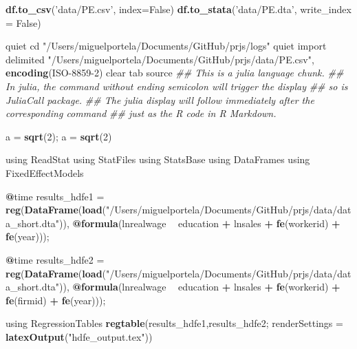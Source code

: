 \documentclass[
  12pt,
]{article}
\newenvironment{Shaded}{\begin{snugshade}}{\end{snugshade}}
\newcommand{\CommentTok}[1]{\textcolor[rgb]{0.56,0.35,0.01}{\textit{#1}}}
\newcommand{\DataTypeTok}[1]{\textcolor[rgb]{0.13,0.29,0.53}{#1}}
\newcommand{\DecValTok}[1]{\textcolor[rgb]{0.00,0.00,0.81}{#1}}
\newcommand{\KeywordTok}[1]{\textcolor[rgb]{0.13,0.29,0.53}{\textbf{#1}}}
\newcommand{\NormalTok}[1]{#1}
\newcommand{\OperatorTok}[1]{\textcolor[rgb]{0.81,0.36,0.00}{\textbf{#1}}}
\newcommand{\StringTok}[1]{\textcolor[rgb]{0.31,0.60,0.02}{#1}}
\begin{document}
\begin{Shaded}
\begin{Highlighting}[]
\KeywordTok{df.to_csv}\NormalTok{(}\StringTok{'data/PE.csv'}\NormalTok{, }\DataTypeTok{index=}\NormalTok{False)}
\KeywordTok{df.to_stata}\NormalTok{(}\StringTok{'data/PE.dta'}\NormalTok{, }\DataTypeTok{write_index =}\NormalTok{ False)}


\NormalTok{quiet cd }\StringTok{"/Users/miguelportela/Documents/GitHub/prjs/logs"}
\NormalTok{quiet import delimited }\StringTok{"/Users/miguelportela/Documents/GitHub/prjs/data/PE.csv"}\NormalTok{, }\KeywordTok{encoding}\NormalTok{(ISO}\DecValTok{-8859-2}\NormalTok{) clear }
\NormalTok{tab source}
\CommentTok{## This is a julia language chunk.}
\CommentTok{## In julia, the command without ending semicolon will trigger the display}
\CommentTok{## so is JuliaCall package.}
\CommentTok{## The julia display will follow immediately after the corresponding command}
\CommentTok{## just as the R code in R Markdown.}

\NormalTok{a =}\StringTok{ }\KeywordTok{sqrt}\NormalTok{(}\DecValTok{2}\NormalTok{);}
\NormalTok{a =}\StringTok{ }\KeywordTok{sqrt}\NormalTok{(}\DecValTok{2}\NormalTok{)}

\NormalTok{using ReadStat}
\NormalTok{using StatFiles}
\NormalTok{using StatsBase}
\NormalTok{using DataFrames}
\NormalTok{using FixedEffectModels}

\OperatorTok{@}\NormalTok{time results_hdfe1 =}\StringTok{ }\KeywordTok{reg}\NormalTok{(}\KeywordTok{DataFrame}\NormalTok{(}\KeywordTok{load}\NormalTok{(}\StringTok{"/Users/miguelportela/Documents/GitHub/prjs/data/data_short.dta"}\NormalTok{)), }\OperatorTok{@}\KeywordTok{formula}\NormalTok{(lnrealwage }\OperatorTok{~}\StringTok{ }\NormalTok{education }\OperatorTok{+}\StringTok{ }\NormalTok{lnsales }\OperatorTok{+}\StringTok{ }\KeywordTok{fe}\NormalTok{(workerid) }\OperatorTok{+}\StringTok{ }\KeywordTok{fe}\NormalTok{(year)));}

\OperatorTok{@}\NormalTok{time results_hdfe2 =}\StringTok{ }\KeywordTok{reg}\NormalTok{(}\KeywordTok{DataFrame}\NormalTok{(}\KeywordTok{load}\NormalTok{(}\StringTok{"/Users/miguelportela/Documents/GitHub/prjs/data/data_short.dta"}\NormalTok{)), }\OperatorTok{@}\KeywordTok{formula}\NormalTok{(lnrealwage }\OperatorTok{~}\StringTok{ }\NormalTok{education }\OperatorTok{+}\StringTok{ }\NormalTok{lnsales }\OperatorTok{+}\StringTok{ }\KeywordTok{fe}\NormalTok{(workerid) }\OperatorTok{+}\StringTok{ }\KeywordTok{fe}\NormalTok{(firmid) }\OperatorTok{+}\StringTok{ }\KeywordTok{fe}\NormalTok{(year)));}



\NormalTok{using RegressionTables}
\KeywordTok{regtable}\NormalTok{(results_hdfe1,results_hdfe2; }\DataTypeTok{renderSettings =} \KeywordTok{latexOutput}\NormalTok{(}\StringTok{"hdfe_output.tex"}\NormalTok{))}


\end{Highlighting}
\end{Shaded}
\end{document}
